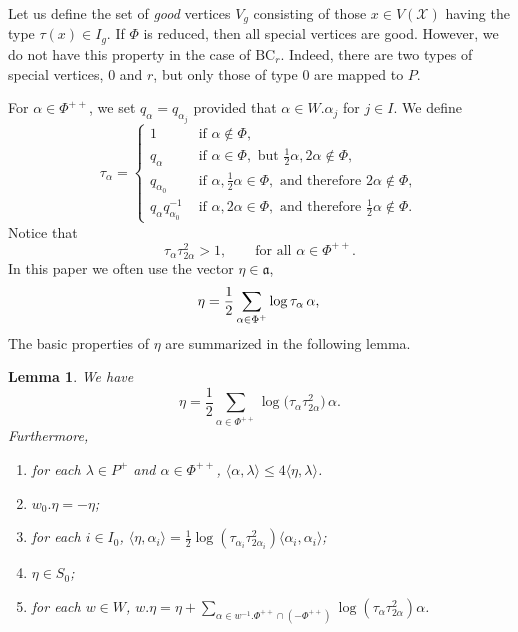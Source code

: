 \documentclass[11pt]{amsart}
\newcommand{\scrX}{\mathscr{X}}
\newcommand{\sprod}[2]{\langle {#1}, {#2} \rangle}
\theoremstyle{plain}
\newtheorem{lemma}[theorem]{Lemma}
\theoremstyle{definition}
\numberwithin{equation}{section}
\begin{document}
Let us define the set of \emph{good} vertices $V_g$ consisting of those $x \in V(\scrX)$ having the
type $\tau(x) \in I_g$. If $\Phi$ is reduced, then all special vertices are good. However, we do not have this property
in the case of $\text{BC}_r$. Indeed, there are two types of special vertices, $0$ and $r$, but only those
of type $0$ are mapped to $P$. 

For $\alpha \in \Phi^{++}$, we set $q_{\alpha} = q_{\alpha_j}$ provided that $\alpha \in W . \alpha_j$ for $j \in I$. We define
\[
	\tau_\alpha = 
	\begin{cases}
		1 	& \text{ if } \alpha \notin \Phi, \\
		q_\alpha & \text{ if } \alpha \in \Phi, \text{ but } \tfrac{1}{2} \alpha, 2 \alpha \notin \Phi, \\
		q_{\alpha_0} & \text{ if } \alpha, \tfrac{1}{2} \alpha \in \Phi, \text{ and therefore } 2 \alpha \notin \Phi, \\ 
		q_{\alpha} q^{-1}_{\alpha_0} & \text{ if } \alpha, 2 \alpha \in \Phi, \text{ and therefore } 
		\tfrac{1}{2}\alpha \notin \Phi.
	\end{cases}
\]
Notice that
\[
	\tau_{\alpha} \tau_{2\alpha}^2 > 1, \qquad \text{for all } \alpha \in \Phi^{++}.
\]
In this paper we often use the vector $\eta \in \mathfrak{a}$,
\begin{equation}
	\label{eq:6}
	\eta = \frac{1}{2} \sum_{\alpha \in \Phi^+} \log \tau_{\alpha}\,\alpha, \\
\end{equation}
The basic properties of $\eta$ are summarized in the following lemma.
\begin{lemma}
	\label{lem:3}
	We have
	\begin{equation}
		\label{eq:6'}
		\eta = \frac{1}{2} \sum_{\alpha \in \Phi^{++}} \log \big( \tau_{\alpha} \tau_{2 \alpha}^2\big) \, \alpha.
	\end{equation}
	Furthermore, 
	\begin{enumerate}[label=(\roman*), ref=\roman*]
		\item 
		\label{en:2:1}
		for each $\lambda \in P^+$ and $\alpha \in \Phi^{++}$, $\sprod{\alpha}{\lambda} \leqslant 4 \sprod{\eta}{\lambda}$.
		\item 
		\label{en:2:2}
		$w_0. \eta = - \eta$;
		\item 
		\label{en:2:3}
		for each $i \in I_0$, $\sprod{\eta}{\alpha_i} = \frac{1}{2} \log (\tau_{\alpha_i} \tau_{2\alpha_i}^2) 
		\sprod{\alpha_i}{\alpha_i}$;
		\item 
		\label{en:2:4}
		$\eta \in S_0$;
		\item
		\label{en:2:5}
		for each $w \in W$,
		$w.\eta = \eta + \sum_{\alpha \in w^{-1}. \Phi^{++} \cap (-\Phi^{++})} \log (\tau_\alpha \tau_{2\alpha}^2)
		\alpha$.
	\end{enumerate}
\end{lemma}
\end{document}
